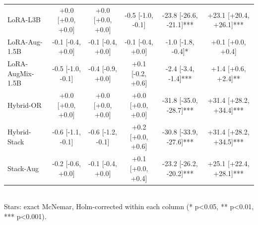 \begin{table}[t]
\begin{tabular}{lccccc}
LoRA-L3B & +0.0 [+0.0, +0.0] & +0.0 [+0.0, +0.0] & -0.5 [-1.0, -0.1] & -23.8 [-26.6, -21.1]*** & +23.1 [+20.4, +26.1]*** \\
LoRA-Aug-1.5B & -0.1 [-0.4, +0.0] & -0.1 [-0.4, +0.0] & -0.1 [-0.4, +0.0] & -1.0 [-1.8, -0.4]* & +0.1 [+0.0, +0.4] \\
LoRA-AugMix-1.5B & -0.5 [-1.0, -0.1] & -0.4 [-0.9, +0.0] & +0.1 [-0.2, +0.6] & -2.4 [-3.4, -1.4]*** & +1.4 [+0.6, +2.4]** \\
Hybrid-OR & +0.0 [+0.0, +0.0] & +0.0 [+0.0, +0.0] & +0.0 [+0.0, +0.0] & -31.8 [-35.0, -28.7]*** & +31.4 [+28.2, +34.4]*** \\
Hybrid-Stack & -0.6 [-1.1, -0.1] & -0.6 [-1.2, -0.1] & +0.2 [+0.0, +0.6] & -30.8 [-33.9, -27.6]*** & +31.4 [+28.2, +34.5]*** \\
Stack-Aug & -0.2 [-0.6, +0.0] & -0.1 [-0.4, +0.0] & +0.1 [+0.0, +0.4] & -23.2 [-26.2, -20.2]*** & +25.1 [+22.4, +28.1]*** \\
\bottomrule
\end{tabular}
\\[2pt]{\scriptsize Stars: exact McNemar, Holm-corrected within each column (* p<0.05, ** p<0.01, *** p<0.001).}
\end{table}